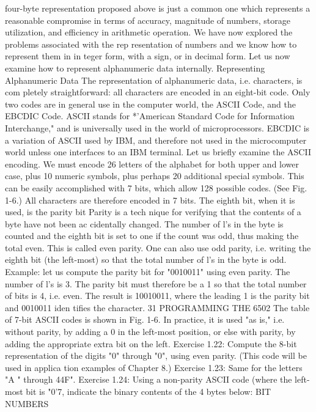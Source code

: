 four-byte representation proposed above is just a common one
which represents a reasonable compromise in terms of accuracy,
magnitude of numbers, storage utilization, and efficiency in
arithmetic operation.
We have now explored the problems associated with the rep
resentation of numbers and we know how to represent them in in
teger form, with a sign, or in decimal form. Let us now examine
how to represent alphanumeric data internally.
Representing Alphanumeric Data
The representation of alphanumeric data, i.e. characters, is com
pletely straightforward: all characters are encoded in an eight-bit
code. Only two codes are in general use in the computer world, the
ASCII Code, and the EBCDIC Code. ASCII stands for *'American
Standard Code for Information Interchange," and is universally
used in the world of microprocessors. EBCDIC is a variation of
ASCII used by IBM, and therefore not used in the microcomputer
world unless one interfaces to an IBM terminal.
Let us briefly examine the ASCII encoding. We must encode 26
letters of the alphabet for both upper and lower case, plus 10
numeric symbols, plus perhaps 20 additional special symbols. This
can be easily accomplished with 7 bits, which allow 128 possible
codes. (See Fig. 1-6.) All characters are therefore encoded in 7 bits.
The eighth bit, when it is used, is the parity bit Parity is a tech
nique for verifying that the contents of a byte have not been ac
cidentally changed. The number of l's in the byte is counted and
the eighth bit is set to one if the count was odd, thus making the
total even. This is called even parity. One can also use odd parity,
i.e. writing the eighth bit (the left-most) so that the total number of
l's in the byte is odd.
Example: let us compute the parity bit for "0010011" using even
parity. The number of l's is 3. The parity bit must therefore be a 1
so that the total number of bits is 4, i.e. even. The result is
10010011, where the leading 1 is the parity bit and 0010011 iden
tifies the character.
31
PROGRAMMING THE 6502
The table of 7-bit ASCII codes is shown in Fig. 1-6. In practice, it
is used "as is," i.e. without parity, by adding a 0 in the left-most
position, or else with parity, by adding the appropriate extra bit on
the left.
Exercise 1.22: Compute the 8-bit representation of the digits "0"
through "0", using even parity. (This code will be used in applica
tion examples of Chapter 8.)
Exercise 1.23: Same for the letters "A " through 44F".
Exercise 1.24: Using a non-parity ASCII code (where the left-most
bit is "0'7, indicate the binary contents of the 4 bytes below:
BIT NUMBERS
